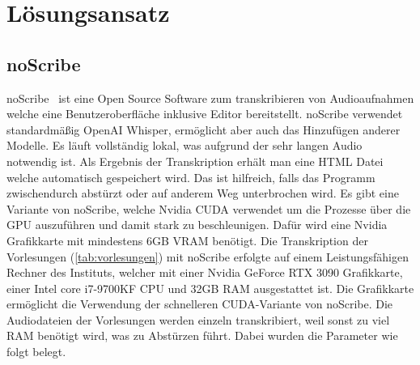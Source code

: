 \chapter{Lösungsansatz}\label{ch:approach}

\section{noScribe}

noScribe~\citep{noscribe} ist eine Open Source Software zum transkribieren von Audioaufnahmen welche eine Benutzeroberfläche inklusive Editor bereitstellt.
noScribe verwendet standardmäßig OpenAI Whisper, ermöglicht aber auch das Hinzufügen anderer Modelle. 
Es läuft vollständig lokal, was aufgrund der sehr langen Audio notwendig ist.
Als Ergebnis der Transkription erhält man eine HTML Datei welche automatisch gespeichert wird.
Das ist hilfreich, falls das Programm zwischendurch abstürzt oder auf anderem Weg unterbrochen wird.
Es gibt eine Variante von noScribe, welche Nvidia CUDA verwendet um die Prozesse über die GPU auszuführen und damit stark zu beschleunigen.
Dafür wird eine Nvidia Grafikkarte mit mindestens 6GB VRAM benötigt.
Die Transkription der Vorlesungen (\cref{tab:vorlesungen}) mit noScribe erfolgte auf einem Leistungsfähigen Rechner des Instituts, welcher mit einer Nvidia GeForce RTX 3090 Grafikkarte, einer Intel core i7-9700KF CPU und 32GB RAM ausgestattet ist.
Die Grafikkarte ermöglicht die Verwendung der schnelleren CUDA-Variante von noScribe. 
Die Audiodateien der Vorlesungen  werden einzeln transkribiert, weil sonst zu viel RAM benötigt wird, was zu Abstürzen führt.
Dabei wurden die Parameter wie folgt belegt.





